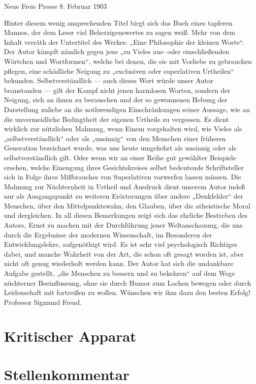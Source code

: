 \documentclass[twoside=true,titlepage=false,open=any, parskip=never, fontsize=10pt, headings=small, chapterprefix=false, appendixprefix=false]{scrbook}
\begin{document}
        \beginnumbering
         
        \pstart
        Neue Freie Presse 8. Februar 1903 
        \pend
     
         Hinter diesem wenig ansprechenden Titel birgt sich das Buch eines tapferen Mannes, der dem Leser viel Beherzigenswertes zu sagen weiß. Mehr von dem Inhalt verräth der Untertitel des Werkes: „Eine Philosophie der kleinen Worte“. Der Autor kämpft nämlich gegen jene „zu Vieles aus- oder einschließenden Wörtchen und Wortformen“, welche bei denen, die sie mit Vorliebe zu gebrauchen pflegen, eine schädliche Neigung zu „exclusiven oder superlativen Urtheilen“ bekunden. Selbstverständlich — auch dieses Wort würde unser Autor beanstanden — gilt der Kampf nicht jenen harmlosen Worten, sondern der Neigung, sich an ihnen zu berauschen und der so gewonnenen Hebung der Darstellung zuliebe an die nothwendigen Einschränkungen seiner Aussage, wie an die unvermeidliche Bedingtheit der eigenen Urtheile zu vergessen. Es dient wirklich zur nützlichen Mahnung, wenn Einem vorgehalten wird, wie Vieles als „selbstverständlich“ oder als „unsinnig“ von den Menschen einer früheren Generation bezeichnet wurde, was uns heute umgekehrt als unsinnig oder als selbstverständlich gilt. Oder wenn wir an einer Reihe gut gewählter Beispiele ersehen, welche Einengung ihres Gesichtskreises selbst bedeutende Schriftsteller sich in Folge ihres Mißbrauches von Superlativen vorwerfen lassen müssen. Die Mahnung zur Nüchternheit in Urtheil und Ausdruck dient unserem Autor indeß nur als Ausgangspunkt zu weiteren Erörterungen über andere „Denkfehler“ der Menschen, über den Mittelpunktswahn, den Glauben, über die atheistische Moral und dergleichen. In all diesen Bemerkungen zeigt sich das ehrliche Bestreben des Autors, Ernst zu machen mit der Durchführung jener Weltanschauung, die uns durch die Ergebnisse der modernen Wissenschaft, im Besonderen der Entwicklungslehre, aufgenöthigt wird. Es ist sehr viel psychologisch Richtiges dabei, und manche Wahrheit von der Art, die schon oft gesagt worden ist, aber nicht oft genug wiederholt werden kann. Der Autor hat sich die undankbare Aufgabe gestellt, „die Menschen zu bessern und zu bekehren“ auf dem Wege nüchterner Beeinflussung, ohne sie durch Humor zum Lachen bewegen oder durch Leidenschaft mit fortreißen zu wollen. Wünschen wir ihm dazu den besten Erfolg! Professor Sigmund Freud.
        \pend
     
        \endnumbering
  
        \section*{Kritischer Apparat}
        
        \section*{Stellenkommentar}
        
        \printindex[person]
        \printindex[kw]
        


        
\end{document}
